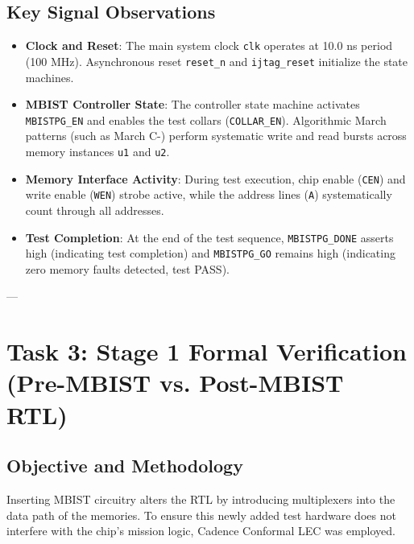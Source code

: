 \documentclass[12pt]{article}
\begin{document}
\subsection{Key Signal Observations}
\begin{itemize}
    \item \textbf{Clock and Reset}: The main system clock \texttt{clk} operates at 10.0 ns period (100 MHz). Asynchronous reset \texttt{reset\_n} and \texttt{ijtag\_reset} initialize the state machines.
    \item \textbf{MBIST Controller State}: The controller state machine activates \texttt{MBISTPG\_EN} and enables the test collars (\texttt{COLLAR\_EN}). Algorithmic March patterns (such as March C-) perform systematic write and read bursts across memory instances \texttt{u1} and \texttt{u2}.
    \item \textbf{Memory Interface Activity}: During test execution, chip enable (\texttt{CEN}) and write enable (\texttt{WEN}) strobe active, while the address lines (\texttt{A}) systematically count through all addresses.
    \item \textbf{Test Completion}: At the end of the test sequence, \texttt{MBISTPG\_DONE} asserts high (indicating test completion) and \texttt{MBISTPG\_GO} remains high (indicating zero memory faults detected, test PASS).
\end{itemize}

---

\section{Task 3: Stage 1 Formal Verification (Pre-MBIST vs. Post-MBIST RTL)}

\subsection{Objective and Methodology}
Inserting MBIST circuitry alters the RTL by introducing multiplexers into the data path of the memories. To ensure this newly added test hardware does not interfere with the chip's mission logic, Cadence Conformal LEC was employed.
\end{document}
